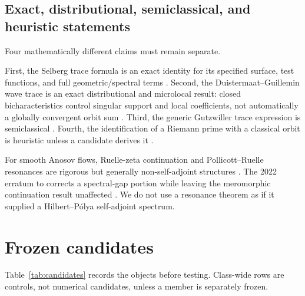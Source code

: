 \documentclass[11pt]{article}
\theoremstyle{definition}
\theoremstyle{remark}
\begin{document}
\subsection{Exact, distributional, semiclassical, and heuristic statements}

Four mathematically different claims must remain separate.

First, the Selberg trace formula is an exact identity for its specified
surface, test functions, and full geometric/spectral terms
\citep{Selberg1956,Hejhal1983}.  Second, the Duistermaat--Guillemin wave trace
is an exact distributional and microlocal result: closed bicharacteristics
control singular support and local coefficients, not automatically a globally
convergent orbit sum \citep{DuistermaatGuillemin1975}.  Third, the generic
Gutzwiller trace expression is semiclassical \citep{Gutzwiller1971}.  Fourth,
the identification of a Riemann prime with a classical orbit is heuristic
unless a candidate derives it \citep{BerryKeating1999}.

For smooth Anosov flows, Ruelle-zeta continuation and Pollicott--Ruelle
resonances are rigorous but generally non-self-adjoint structures
\citep{GLP2013,DyatlovZworski2016}.  The 2022 erratum to
\citet{GLP2013} corrects a spectral-gap portion while leaving the meromorphic
continuation result unaffected \citep{GLPErratum2022}.  We do not use a
resonance theorem as if it supplied a Hilbert--P\'olya self-adjoint spectrum.

\section{Frozen candidates}
\label{sec:candidates}

Table~\ref{tab:candidates} records the objects before testing.  Class-wide
rows are controls, not numerical candidates, unless a member is separately
frozen.
\end{document}
